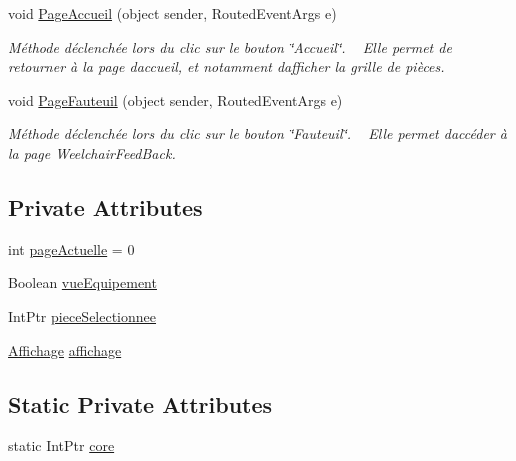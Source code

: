\begin{DoxyCompactItemize}
void \hyperlink{class_my_domotik_1_1_main_page_a46510a49e17c5b0816bc02e8c96fd6e4}{Page\+Accueil} (object sender, Routed\+Event\+Args e)
\begin{DoxyCompactList}\small\item\em Méthode déclenchée lors du clic sur le bouton \char`\"{}\+Accueil\char`\"{}. ~\newline
Elle permet de retourner à la page d\textquotesingle{}accueil, et notamment d\textquotesingle{}afficher la grille de pièces. \end{DoxyCompactList}\item 
void \hyperlink{class_my_domotik_1_1_main_page_a7e2002aa64ba732cbbe5a465e9ce70b2}{Page\+Fauteuil} (object sender, Routed\+Event\+Args e)
\begin{DoxyCompactList}\small\item\em Méthode déclenchée lors du clic sur le bouton \char`\"{}\+Fauteuil\char`\"{}. ~\newline
Elle permet d\textquotesingle{}accéder à la page Weelchair\+Feed\+Back. \end{DoxyCompactList}\end{DoxyCompactItemize}
\subsection*{Private Attributes}
\begin{DoxyCompactItemize}
\item 
int \hyperlink{class_my_domotik_1_1_main_page_a09f4e2e480f274465f901d18aa73e9fb}{page\+Actuelle} = 0
\item 
Boolean \hyperlink{class_my_domotik_1_1_main_page_aab5a1b90bbbf54d6daf2833f0aeb469e}{vue\+Equipement}
\item 
Int\+Ptr \hyperlink{class_my_domotik_1_1_main_page_a06add3e52fde0986ff8c8cb88cfd06c4}{piece\+Selectionnee}
\item 
\hyperlink{class_my_domotik_1_1_affichage}{Affichage} \hyperlink{class_my_domotik_1_1_main_page_abd8e223ae5a150fc8ef42fd884754cc6}{affichage}
\end{DoxyCompactItemize}
\subsection*{Static Private Attributes}
\begin{DoxyCompactItemize}
\item 
static Int\+Ptr \hyperlink{class_my_domotik_1_1_main_page_a8f9c79ea42dfcba7339767330afec556}{core}
\end{DoxyCompactItemize}


